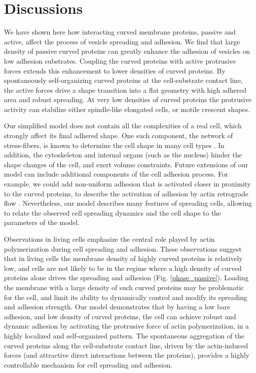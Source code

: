 \documentclass[pre,amsmath]{revtex4}
\begin{document}
\section{Discussions}
\label{sec:sum}

We have shown here how interacting curved membrane proteins, passive and active, affect the process of vesicle spreading and adhesion. We find that large density of passive curved proteins can greatly enhance the adhesion of vesicles on low adhesion substrates. Coupling the curved proteins with active protrusive forces extends this enhancement to lower densities of curved proteins. By spontaneously self-organizing curved proteins at the cell-substrate contact line, the active forces drive a shape transition into a flat geometry with high adhered area and robust spreading. At very low densities of curved proteins the protrusive activity can stabilize either spindle-like elongated cells, or motile crescent shapes.

Our simplified model does not contain all the complexities of a real cell, which strongly affect its final adhered shape. One such component, the network of stress-fibers, is known to determine the cell shape in many cell types \cite{schwarz2013physics}. In addition, the cytoskeleton and internal organs (such as the nucleus) hinder the shape changes of the cell, and exert volume constraints. Future extensions of our model can include additional components of the cell adhesion process. For example, we could add non-uniform adhesion that is activated closer in proximity to the curved proteins, to describe the activation of adhesion by actin retrograde flow \cite{bershadsky2003adhesion,geiger2009environmental,gardel2010mechanical,Ibata2020nascent}. Nevertheless, our model describes many features of spreading cells, allowing to relate the observed cell spreading dynamics and the cell shape to the parameters of the model. 

Observations in living cells emphasize the central role played by actin polymerization during cell spreading and adhesion. These observations suggest that in living cells the membrane density of highly curved proteins is relatively low, and cells are not likely to be in the regime where a high density of curved proteins alone drives the spreading and adhesion (Fig. \ref{phase_passive}). Loading the membrane with a large density of such curved proteins may be problematic for the cell, and limit its ability to dynamically control and modify its spreading and adhesion strength. Our model demonstrates that by having a low bare adhesion, and low density of curved proteins, the cell can achieve robust and dynamic adhesion by activating the protrusive force of actin polymerization, in a highly localized and self-organized pattern. The spontaneous aggregation of the curved proteins along the cell-substrate contact line, driven by the actin-induced forces (and attractive direct interactions between the proteins), provides a highly controllable mechanism for cell spreading and adhesion.
\end{document}
